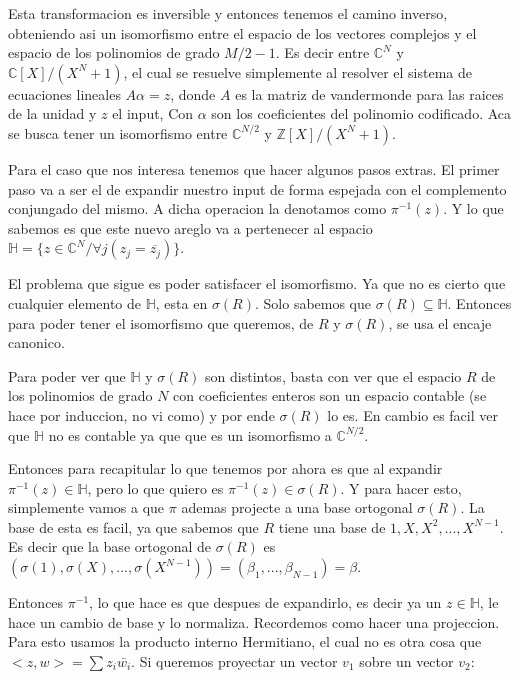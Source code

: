 \documentclass[12pt, oneside]{article}
\begin{document}
Esta transformacion es inversible y entonces tenemos el camino inverso, obteniendo asi un
isomorfismo entre el espacio de los vectores complejos y el espacio de los polinomios de grado
$M/2 -1$.
Es decir entre $\mathbb{C}^{N}$ y $\mathbb{C}[X]/(X^N+1)$, el cual se resuelve simplemente
al resolver el sistema de ecuaciones lineales $A\alpha=z$, donde $A$ es la
matriz de vandermonde para las raices de la unidad y $z$ el input,
Con $\alpha$ son los coeficientes del polinomio codificado.
Aca se busca tener un isomorfismo entre $\mathbb{C}^{N/2}$ y
$\mathbb{Z}[X]/(X^N+1)$.

Para el caso que nos interesa tenemos que hacer algunos pasos extras.
El primer paso va a ser el de expandir nuestro input de forma espejada con el
complemento conjungado del mismo.
A dicha operacion la denotamos como $\pi^{-1}(z)$.
Y lo que sabemos es que este nuevo areglo va a pertenecer al espacio
$\mathbb{H}=\{z\in\mathbb{C}^N/ \forall j (z_j=\overline{z_j})\}$.

El problema que sigue es poder satisfacer el isomorfismo.
Ya que no es cierto que cualquier elemento de $\mathbb{H}$,
esta en $\sigma(R)$.
Solo sabemos que $\sigma(R)\subseteq \mathbb{H}$.
Entonces para poder tener el isomorfismo que queremos, de $R$ y $\sigma(R)$,
se usa el encaje canonico.

Para poder ver que $\mathbb{H}$ y $\sigma(R)$ son distintos, basta con ver que
el espacio $R$ de los polinomios de grado $N$ con coeficientes enteros son un espacio
contable (se hace por induccion, no vi como) y por ende $\sigma(R)$ lo es.
En cambio es facil ver que $\mathbb{H}$ no es contable ya que que es un isomorfismo
a $\mathbb{C}^{N/2}$.

Entonces para recapitular lo que tenemos por ahora es que al expandir $\pi^{-1}(z)\in\mathbb{H}$,
pero lo que quiero es $\pi^{-1}(z)\in\sigma(R)$.
Y para hacer esto, simplemente vamos a que $\pi$ ademas projecte a una base ortogonal  $\sigma(R)$.
La base de esta es facil, ya que sabemos que $R$ tiene una base de $1, X, X^2, ..., X^{N-1}$.
Es decir que la base ortogonal de  $\sigma(R)$ es $(\sigma(1), \sigma(X),..., \sigma(X^{N-1}))=(\beta_1,...,\beta_{N-1})=\beta$.

Entonces $\pi^{-1}$, lo que hace es que despues de expandirlo, es decir ya un $z\in\mathbb{H}$,
le hace un cambio de base y lo normaliza.
Recordemos como hacer una projeccion.
Para esto usamos la producto interno Hermitiano, el cual no es otra cosa que $<z,w>=\sum z_i\bar{w_i}$.
Si queremos proyectar un vector $v_1$ sobre un vector $v_2$:
\end{document}

